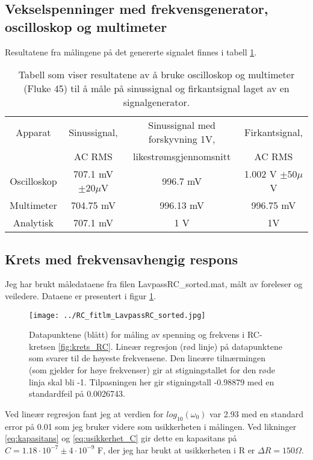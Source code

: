 \documentclass[reprint, english,notitlepage]{revtex4-1}  %
\begin{document}
\subsection{Vekselspenninger med frekvensgenerator, oscilloskop og multimeter}
Resultatene fra målingene på det genererte signalet finnes i tabell \ref{table:AC_RMS}.
\begin{table}[p]
\label{table:AC_RMS}
\caption{Tabell som viser resultatene av å bruke oscilloskop og multimeter (Fluke 45) til å måle på sinussignal og firkantsignal laget av en signalgenerator.}

\begin{adjustbox}{width=\linewidth}
\begin{tabular}{||c || c | c | c||}
\hline
Apparat     & Sinussignal, & Sinussignal med forskyvning 1V, & Firkantsignal, \\
            & AC RMS      & likestrømsgjennomsnitt          & AC RMS        \\ \hline\hline
Oscilloskop & 707.1 mV $\pm 20 \mu$V  & 996.7 mV            & 1.002 V $\pm 50 \mu$V \\ \hline
Multimeter  & 704.75 mV   & 996.13 mV                       & 996.75 mV     \\ \hline
Analytisk   & 707.1 mV    & 1 V                             & 1V            \\ \hline
\end{tabular}
\end{adjustbox}
\end{table}

\subsection{Krets med frekvensavhengig respons}
Jeg har brukt måledataene fra filen LavpassRC\_sorted.mat, målt av foreleser og veiledere. Dataene er presentert i figur \ref{fig:LavpassRC}.
\begin{figure}
  \texttt{[image: ../RC\_fitlm\_LavpassRC\_sorted.jpg]}
  \caption{Datapunktene (blått) for måling av spenning og frekvens i RC-kretsen \ref{fig:krets_RC}. Lineær regresjon (rød linje) på datapunktene som svarer til de høyeste frekvensene. Den lineære tilnærmingen (som gjelder for høye frekvenser) gir at stigningstallet for den røde linja skal bli -1. Tilpasningen her gir stigningstall -0.98879 med en standardfeil på 0.0026743.}
  \label{fig:LavpassRC}
\end{figure}
Ved lineær regresjon fant jeg at verdien for $log_{10}(\omega_0)$ var 2.93 med en standard error på 0.01 som jeg bruker videre som usikkerheten i målingen. Ved likninger \ref{eq:kapasitans} og \ref{eq:usikkerhet_C} gir dette en kapasitans på $C = 1.18 \cdot 10^{-7} \pm 4 \cdot 10^{-9}$ F, der jeg har brukt at usikkerheten i R er $\Delta R =  150 \Omega$.
\end{document}
